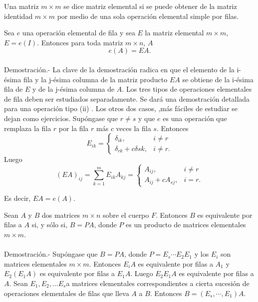     \begin{def.}
	Una matriz $m\times m$ se dice matriz elemental si se puede obtener de la matriz identidad $m\times m$ por medio de una sola operación elemental simple por filas.
    \end{def.}

\begin{teo}
    Sea $e$ una operación elemental de fila y sea $E$ la matriz elemental $m\times m$, $E=e(I)$. Entonces para toda matriz $m\times n$, $A$
    $$e(A)=EA.$$\\
	Demostración.-\; La clave de la demostración radica en que el elemento de la i-ésima fila y la j-ésima columna de la matriz producto $EA$ se obtiene de la i-ésima fila de $E$ y de la j-ésima columna de $A$. Los tres tipos de operaciones elementales de fila deben ser estudiados separadamente. Se dará una demostración detallada para una operación tipo (ii) . Los otros dos casos, ,más fáciles de estudiar se dejan como ejercicios. Supóngase que $r\neq s$ y que $e$ es una operación que remplaza la fila $r$ por la fila $r$ más $c$ veces la fila $s$. Entonces
	$$E_{ik}=\left\{\begin{array}{ll}
		\delta_{ik}, & i\neq r\\
		\delta_{rk} + c\delta sk, & i\neq r.
    \end{array}\right.$$
    Luego
    $$ (EA)_{ij}=\sum_{k=1}^m E_{ik}A_{kj} = \left\{\begin{array}{ll}
	    		A_{ij}, & i\neq r\\
			A_{ij} + cA_{sj}, & i=r.
    \end{array}\right.$$

    Es decir, $EA=e(A).$\\

\end{teo}

\begin{cor}
    Sean $A$ y $B$ dos matrices $m\times n$ sobre el cuerpo $F$. Entonces $B$ es equivalente por filas a $A$ si, y sólo si, $B=PA$, donde $P$ es un producto de matrices elementales $m\times m$.\\\\
	Demostración.-\; Supóngase que $B=PA$, donde $P=E_s\cdots E_2E_1$ y los $E_i$ son matrices elementales $m\times m$. Entonces $E_iA$ es equivalente por filas a $A_1$ y $E_2(E_1A)$ es equivalente por filas a $E_1A$. Luego $E_2E_1A$ es equivalente por filas a $A$. Sean $E_1,E_2,\ldots E_s$a matrices elementales correspondientes a cierta sucesión de operaciones elementales de filas que lleva $A$ a $B$. Entonces $B=(E_s,\cdots , E_1)A.$
\end{cor}


